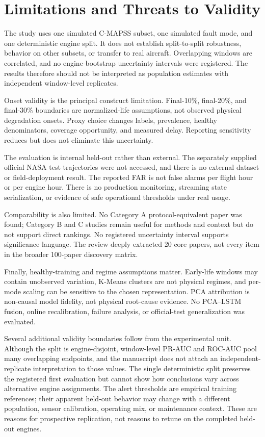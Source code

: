 \documentclass[11pt]{article}
\begin{document}
\section{Limitations and Threats to Validity}


The study uses one simulated C-MAPSS subset, one simulated fault mode, and one deterministic engine split. It does not establish split-to-split robustness, behavior on other subsets, or transfer to real aircraft. Overlapping windows are correlated, and no engine-bootstrap uncertainty intervals were registered. The results therefore should not be interpreted as population estimates with independent window-level replicates.


Onset validity is the principal construct limitation. Final-10\%, final-20\%, and final-30\% boundaries are normalized-life assumptions, not observed physical degradation onsets. Proxy choice changes labels, prevalence, healthy denominators, coverage opportunity, and measured delay. Reporting sensitivity reduces but does not eliminate this uncertainty.


The evaluation is internal held-out rather than external. The separately supplied official NASA test trajectories were not accessed, and there is no external dataset or field-deployment result. The reported FAR is not false alarms per flight hour or per engine hour. There is no production monitoring, streaming state serialization, or evidence of safe operational thresholds under real usage.


Comparability is also limited. No Category A protocol-equivalent paper was found; Category B and C studies remain useful for methods and context but do not support direct rankings. No registered uncertainty interval supports significance language. The review deeply extracted 20 core papers, not every item in the broader 100-paper discovery matrix.


Finally, healthy-training and regime assumptions matter. Early-life windows may contain unobserved variation, K-Means clusters are not physical regimes, and per-mode scaling can be sensitive to the chosen representation. PCA attribution is non-causal model fidelity, not physical root-cause evidence. No PCA--LSTM fusion, online recalibration, failure analysis, or official-test generalization was evaluated.


Several additional validity boundaries follow from the experimental unit. Although the split is engine-disjoint, window-level PR-AUC and ROC-AUC pool many overlapping endpoints, and the manuscript does not attach an independent-replicate interpretation to those values. The single deterministic split preserves the registered first evaluation but cannot show how conclusions vary across alternative engine assignments. The alert thresholds are empirical training references; their apparent held-out behavior may change with a different population, sensor calibration, operating mix, or maintenance context. These are reasons for prospective replication, not reasons to retune on the completed held-out engines.
\end{document}
